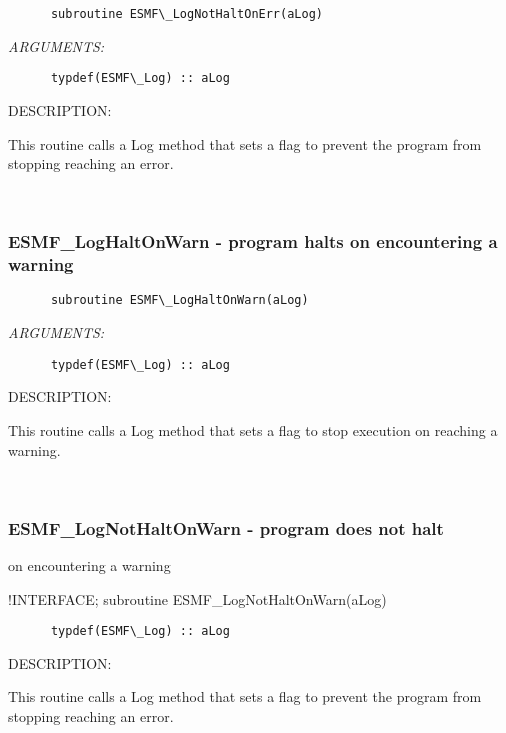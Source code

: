 \begin{verbatim}      subroutine ESMF\_LogNotHaltOnErr(aLog)\end{verbatim}{\em ARGUMENTS:}
\begin{verbatim}      typdef(ESMF\_Log) :: aLog\end{verbatim}
{\sf DESCRIPTION:\\ }


      This routine calls a Log method that sets a flag to prevent the program
      from stopping reaching an error.  
 
\mbox{}\hrulefill\ 
 

  \subsubsection [ESMF\_LogHaltOnWarn] {ESMF\_LogHaltOnWarn - program halts on encountering a warning}


  
\begin{verbatim}      subroutine ESMF\_LogHaltOnWarn(aLog)\end{verbatim}{\em ARGUMENTS:}
\begin{verbatim}      typdef(ESMF\_Log) :: aLog\end{verbatim}
{\sf DESCRIPTION:\\ }


      This routine calls a Log method that sets a flag to stop execution on
      reaching a warning. 
 
\mbox{}\hrulefill\ 
 

  \subsubsection [ESMF\_LogNotHaltOnWarn] {ESMF\_LogNotHaltOnWarn - program does not halt}


                                     on encountering a warning
  
   !INTERFACE;
      subroutine ESMF\_LogNotHaltOnWarn(aLog)             
\begin{verbatim}      typdef(ESMF\_Log) :: aLog                                        
                                \end{verbatim}
{\sf DESCRIPTION:\\ }

 
      This routine calls a Log method that sets a flag to prevent the program
      from stopping reaching an error.                            
